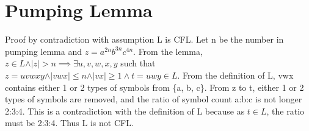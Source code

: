 \documentclass{article}
\begin{document}
\section{Pumping Lemma}
Proof by contradiction with assumption L is CFL. Let n be the number in pumping
lemma and $z = a^{2n}b^{3n}c^{4n}$. From the lemma, $z \in L \land \vert z
\vert > n \implies \exists u, v, w, x, y$ such that $z = uvwxy \land \vert vwx
\vert \leq n \land \vert vx \vert \geq 1 \land t =uwy \in L$.
From the definition of L, vwx contains either 1 or 2 types of symbols from \{a, b, c\}. From z to t,
either 1 or 2 types of symbols are removed, and the ratio of symbol count a:b:c
is not longer 2:3:4. This is a contradiction with the definition of L because as
$t \in L$, the ratio must be 2:3:4. Thus L is not CFL.
\end{document}
